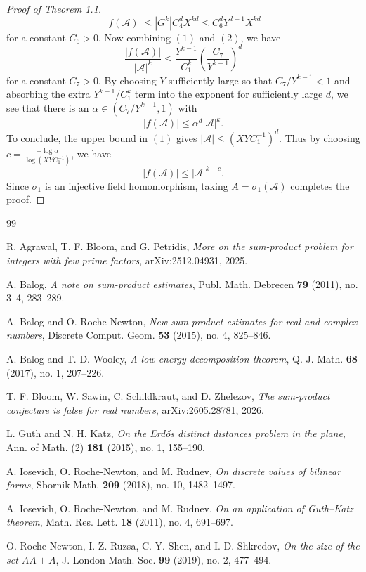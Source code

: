 \documentclass[11pt]{amsart}
\theoremstyle{plain}
\theoremstyle{definition}\newtheorem{remark}[theorem]{Remark}
\theoremstyle{definition}\newtheorem*{remark*}{Remark}
\theoremstyle{definition}\newtheorem{definition}[theorem]{Definition}
\theoremstyle{definition}\newtheorem*{definition*}{Definition}
\theoremstyle{definition}\newtheorem*{idea}{Idea}
\theoremstyle{definition}\newtheorem*{comments}{Comment}
\theoremstyle{definition}\newtheorem{example}[theorem]{Example}
\theoremstyle{definition}\newtheorem*{example*}{Example}
\newcommand{\0}{\varnothing} %
\begin{document}
\begin{proof}[Proof of Theorem 1.1]
\[
|f(\mathcal A)|\leq|G^k|C_4^dX^{kd}\leq C_6^dY^{d-1}X^{kd}
\tag{2}
\]
for a constant $C_6>0$. Now combining $(1)$ and $(2)$, we have
\[
\frac{|f(\mathcal A)|}{|\mathcal A|^k}\leq \frac{Y^{k-1}}{C_1^k}\left(\frac{C_7}{Y^{k-1}}\right)^d
\]
for a constant $C_7>0$. By choosing $Y$ sufficiently large so that $C_7/Y^{k-1}<1$ and absorbing the extra $Y^{k-1}/C_1^k$ term into the exponent for sufficiently large $d$, we see that there is an $\alpha\in(C_7/Y^{k-1},1)$ with
\[
|f(\mathcal A)|\leq \alpha^d|\mathcal A|^k.
\]
To conclude, the upper bound in $(1)$ gives $|\mathcal A|\leq(XYC_1^{-1})^d$. Thus by choosing $c=\frac{-\log\alpha}{\log(XYC_1^{-1})}$, we have
\[
|f(\mathcal A)|\leq|\mathcal A|^{k-c}.
\]
Since $\sigma_1$ is an injective field homomorphism, taking $A=\sigma_1(\mathcal A)$ completes the proof.
\end{proof}

\begin{thebibliography}{99}

R. Agrawal, T. F. Bloom, and G. Petridis,
\emph{More on the sum-product problem for integers with few prime factors},
arXiv:2512.04931, 2025.

A. Balog,
\emph{A note on sum-product estimates},
Publ. Math. Debrecen \textbf{79} (2011), no. 3--4, 283--289.

A. Balog and O. Roche-Newton,
\emph{New sum-product estimates for real and complex numbers},
Discrete Comput. Geom. \textbf{53} (2015), no. 4, 825--846.

A. Balog and T. D. Wooley,
\emph{A low-energy decomposition theorem},
Q. J. Math. \textbf{68} (2017), no. 1, 207--226.

T. F. Bloom, W. Sawin, C. Schildkraut, and D. Zhelezov,
\emph{The sum-product conjecture is false for real numbers},
arXiv:2605.28781, 2026.

L. Guth and N. H. Katz,
\emph{On the Erd\H{o}s distinct distances problem in the plane},
Ann. of Math. (2) \textbf{181} (2015), no. 1, 155--190.

A. Iosevich, O. Roche-Newton, and M. Rudnev,
\emph{On discrete values of bilinear forms},
Sbornik Math. \textbf{209} (2018), no. 10, 1482--1497.

A. Iosevich, O. Roche-Newton, and M. Rudnev,
\emph{On an application of Guth--Katz theorem},
Math. Res. Lett. \textbf{18} (2011), no. 4, 691--697.

O. Roche-Newton, I. Z. Ruzsa, C.-Y. Shen, and I. D. Shkredov,
\emph{On the size of the set $AA+A$},
J. London Math. Soc. \textbf{99} (2019), no. 2, 477--494.

\end{thebibliography}
\end{document}
